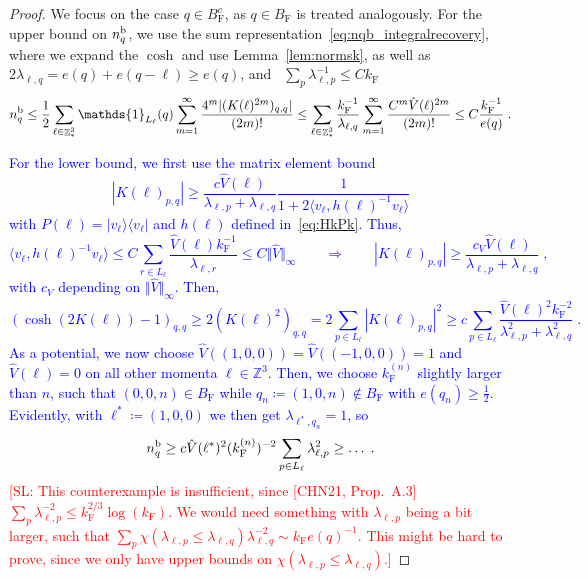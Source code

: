 \documentclass[12pt,a4paper]{article}
\numberwithin{equation}{section}
\newcommand{\ZZZ}{\mathbb{Z}}
\newcommand{\1}{\mathbb{I}}
\renewcommand{\b}{\textnormal{b}}
\newcommand{\F}{\mathrm{F}}
\DeclareMathOperator{\Z}{\mathbb{Z}}
\newcommand{\half}{\frac{1}{2}}
\theoremstyle{plain}
\theoremstyle{definition}
\theoremstyle{remark}
\theoremstyle{plain}
\theoremstyle{definition}
\theoremstyle{remark}
\begin{document}
\begin{proof}
We focus on the case $ q \in B_{\F}^c $, as $ q \in B_{\F} $ is treated analogously. For the upper bound on $ n_q^{\b} $, we use the sum representation~\eqref{eq:nqb_integralrecovery}, where we expand the $ \cosh $ and use Lemma~\ref{lem:normsk}, as well as $ 2 \lambda_{\ell,q} = e(q) + e(q - \ell) \ge e(q) $, and~\cite[Prop.~A.2]{CHN21} $ \sum_p \lambda_{\ell,p}^{-1} \le C k_{\F} $
\begin{equation}
	n_q^{\b}
	\le \half \sum_{\ell \in \Z^3_*} \mathds{1}_{L_\ell}(q) \sum_{m=1}^{\infty} \frac{4^m |(K(\ell)^{2m})_{q,q}|}{(2m)!}
	\le \sum_{\ell \in \Z^3_*} \frac{k_{\F}^{-1}}{\lambda_{\ell,q}} \sum_{m=1}^{\infty} \frac{C^m \hat{V}(\ell)^{2m}}{(2m)!}
	\le C \frac{k_{\F}^{-1}}{e(q)} \;.
\end{equation}

\textcolor{blue}{
For the lower bound, we first use the matrix element bound~\cite[Prop.~7.8]{CHN21}
\begin{equation}
	|K(\ell)_{p,q}| \ge \frac{c \hat{V}(\ell)}{\lambda_{\ell,p} + \lambda_{\ell,q}} \frac{1}{1+2 \langle v_\ell, h(\ell)^{-1} v_\ell \rangle}
\end{equation}
with $ P(\ell) = |v_\ell \rangle \langle v_\ell | $ and $ h(\ell) $ defined in~\eqref{eq:HkPk}. Thus,
\begin{equation}
	\langle v_\ell, h(\ell)^{-1} v_\ell \rangle \le C \sum_{r \in L_\ell} \frac{\hat{V}(\ell) k_{\F}^{-1}}{\lambda_{\ell,r}} \le C \Vert \hat{V} \Vert_\infty
	\qquad \Rightarrow \qquad
	|K(\ell)_{p,q}|
	\ge \frac{c_V \hat{V}(\ell)}{\lambda_{\ell,p} + \lambda_{\ell,q}} \;,
\end{equation}
with $ c_V $ depending on $ \Vert \hat{V} \Vert_\infty $. Then,
\begin{equation}
	(\cosh(2K(\ell)) - 1)_{q,q}
	\ge 2 (K(\ell)^2)_{q,q}
	= 2 \sum_{p \in L_\ell} |K(\ell)_{p,q}|^2
	\ge c \sum_{p \in L_\ell} \frac{\hat{V}(\ell)^2 k_{\F}^{-2}}{\lambda_{\ell,p}^2 + \lambda_{\ell,q}^2} \;.
\end{equation}
As a potential, we now choose $ \hat{V}((1,0,0)) = \hat{V}((-1,0,0)) = 1 $ and $ \hat{V}(\ell) = 0 $ on all other momenta $ \ell \in \ZZZ^3 $. Then, we choose $ k_{\F}^{(n)} $ slightly larger than $ n $, such that $ (0,0,n) \in B_{\F} $ while $ q_n \coloneq (1,0,n) \notin B_{\F} $ with $ e(q_n) \ge \half $. Evidently, with $ \ell^* \coloneq (1,0,0) $ we then get $ \lambda_{\ell^*, q_n} = 1 $, so
\begin{equation}
	n_q^{\b}
	\ge c \hat{V}(\ell^*)^2 (k_{\F}^{(n)})^{-2} \sum_{p \in L_\ell} \lambda_{\ell,p}^2 
	\ge \ldots \;.
\end{equation}
}
\textcolor{red}{[SL: This counterexample is insufficient, since [CHN21, Prop.~A.3] $ \sum_p \lambda_{\ell,p}^{-2} \le k_{\F}^{2/3} \log(k_{\F}) $. We would need something with $ \lambda_{\ell,p} $ being a bit larger, such that $ \sum_p  \chi(\lambda_{\ell,p} \le \lambda_{\ell,q}) \lambda_{\ell,q}^{-2} \sim k_{\F} e(q)^{-1} $. This might be hard to prove, since we only have upper bounds on $ \chi(\lambda_{\ell,p} \le \lambda_{\ell,q}) $.]}
\end{proof}
\end{document}
